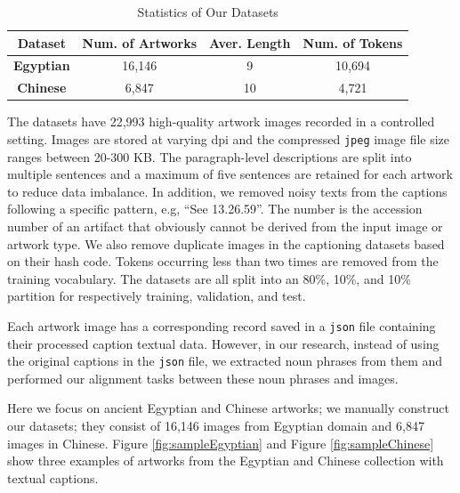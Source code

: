 \begin{table}[h!]
\centering
\begin{tabular}{|c|c|c|c|}
\hline
\textbf{Dataset}          & \textbf{Num. of Artworks} & \textbf{Aver. Length} & \textbf{Num. of Tokens} \\ \hline
\textbf{Egyptian} & 16,146                       & 9                       & 10,694                     \\ \hline
\textbf{Chinese}  & 6,847                        & 10                      & 4,721                      \\ \hline
\end{tabular}
\caption{Statistics of Our Datasets}
\label{fig:datasetstats}
\end{table}

The datasets have 22,993 high-quality artwork images recorded
in a controlled setting. Images are stored at varying dpi and the
compressed \verb|jpeg| image file size ranges between 20-300 KB. The paragraph-level descriptions are split into multiple sentences and a maximum of five sentences are retained for each artwork to reduce data imbalance. In addition, we removed noisy texts from the captions following a specific pattern, e.g, ``See 13.26.59''. The number is the accession number of an artifact that obviously cannot be derived from the input image or artwork type. We also remove duplicate images in the captioning datasets based on their hash code. Tokens occurring less than two times are removed from the training vocabulary. The datasets are all split into an 80\%, 10\%, and 10\% partition for respectively training, validation, and test.

Each artwork image has a corresponding record saved in a \verb|json| file containing their processed caption textual data. However, in our research, instead of using the original captions in the \verb|json| file, we extracted noun phrases from them and performed our alignment tasks between these noun phrases and images.

Here we focus on ancient Egyptian and Chinese artworks; we manually construct our datasets; they consist of 16,146 images from Egyptian domain and 6,847 images in Chinese. Figure \ref{fig:sampleEgyptian} and Figure \ref{fig:sampleChinese} show three examples of artworks from the Egyptian and Chinese collection with textual captions.

